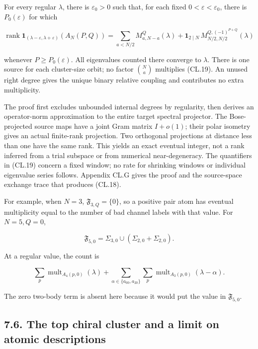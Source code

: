 For every regular \(\lambda\), there is \(\varepsilon_0>0\) such that, for each fixed \(0<\varepsilon<\varepsilon_0\), there is \(P_0(\varepsilon)\) for which

\[
\operatorname{rank}\mathbf1_{(\lambda-\varepsilon,\lambda+\varepsilon)}(A_N(P,Q))
=\sum_{a<N/2}M_{a,N-a}^{Q}(\lambda)
+\mathbf1_{2\mid N}\,M_{N/2,N/2}^{Q,(-1)^{P+Q}}(\lambda)
\tag{CL.19}
\]

whenever \(P\geq P_0(\varepsilon)\). All eigenvalues counted there converge to \(\lambda\). There is one source for each cluster-size orbit; no factor \(\binom Na\) multiplies (CL.19). An unused right degree gives the unique binary relative coupling and contributes no extra multiplicity.

The proof first excludes unbounded internal degrees by regularity, then derives an operator-norm approximation to the entire target spectral projector. The Bose-projected source maps have a joint Gram matrix \(I+o(1)\); their polar isometry gives an actual finite-rank projection. Two orthogonal projections at distance less than one have the same rank. This yields an exact eventual integer, not a rank inferred from a trial subspace or from numerical near-degeneracy. The quantifiers in (CL.19) concern a fixed window; no rate for shrinking windows or individual eigenvalue series follows. Appendix CL.G gives the proof and the source-space exchange trace that produces (CL.18).

For example, when \(N=3\), \(\mathfrak F_{3,Q}=\{0\}\), so a positive pair atom has eventual multiplicity equal to the number of bad channel labels with that value. For \(N=5,Q=0\),

\[
\mathfrak F_{5,0}=\Sigma_{3,0}\cup(\Sigma_{2,0}+\Sigma_{2,0}).
\]

At a regular value, the count is

\[
\sum_p\operatorname{mult}_{A_4(p,0)}(\lambda)
+\sum_{\alpha\in\{a_{00},a_{20}\}}\sum_p
\operatorname{mult}_{A_3(p,0)}(\lambda-\alpha).
\]

The zero two-body term is absent here because it would put the value in \(\mathfrak F_{5,0}\).

\hypertarget{the-top-chiral-cluster-and-a-limit-on-atomic-descriptions}{%
\subsection{7.6. The top chiral cluster and a limit on atomic descriptions}\label{the-top-chiral-cluster-and-a-limit-on-atomic-descriptions}}

